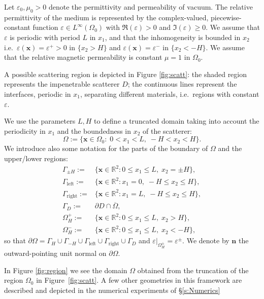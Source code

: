 \documentclass[a4paper,10pt]{article}
\newcommand{\IR}{{\mathbb R}}
\newcommand{\bx}{{\mathbf x}}
\newcommand{\bn}{{\mathbf n}}
\newcommand{\GD}{{\Gamma_D}}
\newcommand{\GH}{{\Gamma_H}}
\newcommand{\GmH}{{\Gamma_{-H}}}
\newcommand{\GpmH}{{\Gamma_{\pm H}}}
\newcommand{\Gleft}{\Gamma_{\mathrm{left}}}
\newcommand{\Gright}{\Gamma_{\mathrm{right}}}
\begin{document}
	Let $\varepsilon_0,\mu_0>0$ denote the permittivity and permeability of vacuum.
	The relative 
	permittivity of the medium is represented by the complex-valued, piecewise-constant function $\varepsilon\in L^\infty(\Omega_0)$ with $\Re(\varepsilon) > 0$ and $\Im(\varepsilon) \geq 0$.
	We assume that $\varepsilon$ is periodic with period $L$ in $x_1$, and that the inhomogeneity is bounded in $x_2$ i.e.\  $\varepsilon(\bx)=\varepsilon^+>0$ in $\{x_2>H\}$ and $\varepsilon(\bx)=\varepsilon^-$ in $\{x_2<-H\}$.
	We assume that the relative magnetic permeability is constant $\mu=1$ in $\Omega_0$.
	
	A possible scattering region is depicted in Figure \ref{fig:scatt}:
	the shaded region represents the impenetrable scatterer $D$;
	the continuous lines represent the interfaces, periodic in $x_1$, separating different materials, i.e.\ regions with constant $\varepsilon$.
	
	We use the parameters $L,H$ to define a truncated domain taking into account the periodicity in $x_1$ and the boundedness in $x_2$ of the scatterer:
	\begin{equation}\label{eq:Omega}
		\Omega:=\{\bx\in\Omega_0:\; 0<x_1<L,\; -H<x_2<H\}.
	\end{equation}
	We introduce also some notation for the parts of the boundary of $\Omega$ and the upper/lower regions:
	\begin{align*}
		\GpmH:=&\{\bx\in\IR^2: 0\le x_1\le L,\; x_2=\pm H \},\\
		\Gleft:=&\{\bx\in\IR^2:  x_1=0,\; -H\le x_2\le H \},\\
		\Gright:=&\{\bx\in\IR^2:  x_1=L,\; -H\le x_2\le H \},\\
		\GD:=& \partial D\cap\overline\Omega,\\
		\Omega_H^+:=&\{\bx\in\IR^2:   0\le x_1\le L,\; x_2> H \},\\
		\Omega_H^-:=&\{\bx\in\IR^2:   0\le x_1\le L,\; x_2<- H \},
	\end{align*}
	so that $\partial\Omega=\GH\cup\GmH\cup\Gleft\cup\Gright\cup\GD$ and $\varepsilon|_{\Omega_H^\pm}=\varepsilon^\pm$.
	We denote by $\bn$ the outward-pointing unit normal on $\partial\Omega$.
	
	In Figure \ref{fig:region} we see the domain $\Omega$ obtained from the truncation of the region $\Omega_0$ in Figure~\ref{fig:scatt}.
	A few other geometries in this framework are described and depicted in the numerical experiments of \S\ref{s:Numerics}
	
\end{document}
